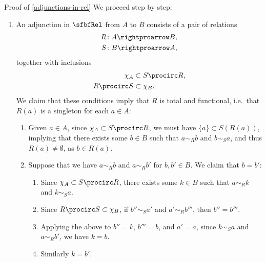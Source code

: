 \begin{Proof}{Proof of \cref{adjunctions-in-rel}}%
    We proceed step by step:
    \begin{enumerate}
        \item\label{proof-of-adjunctions-in-rel-1}An adjunction in $\sfbfRel$ from $A$ to $B$ consists of a pair of relations
            \begin{align*}
                R &\colon A\rightproarrow B,\\
                S &\colon B\rightproarrow A,
            \end{align*}
            together with inclusions
            \begin{align*}
                \chi_{A}    &\subset S\procirc R,\\
                R\procirc S &\subset \chi_{B}.
            \end{align*}
            We claim that these conditions imply that $R$ is total and functional, i.e.\ that $R(a)$ is a singleton for each $a\in A$:
            \begin{enumerate}
                \item\label{proof-of-adjunctions-in-rel-1a}Given $a\in A$, since $\chi_{A}\subset S\procirc R$, we must have $\{a\}\subset S(R(a))$, implying that there exists some $b\in B$ such that $a\sim_{R}b$ and $b\sim_{S}a$, and thus $R(a)\neq\emptyset$, as $b\in R(a)$.
                \item\label{proof-of-adjunctions-in-rel-1b}Suppose that we have $a\sim_{R}b$ and $a\sim_{R}b'$ for $b,b'\in B$. We claim that $b=b'$:
                    \begin{enumerate}
                        \item\label{proof-of-adjunctions-in-rel-1bi}Since $\chi_{A}\subset S\procirc R$, there exists some $k\in B$ such that $a\sim_{R}k$ and $k\sim_{S}a$.
                        \item\label{proof-of-adjunctions-in-rel-1bii}Since $R\procirc S\subset\chi_{B}$, if $b''\sim_{S}a'$ and $a'\sim_{R}b'''$, then $b''=b'''$.
                        \item\label{proof-of-adjunctions-in-rel-1biii}Applying the above to $b''=k$, $b'''=b$, and $a'=a$, since $k\sim_{S}a$ and $a\sim_{R}b'$, we have $k=b$.
                        \item\label{proof-of-adjunctions-in-rel-1biv}Similarly $k=b'$.

\end{enumerate}
\end{enumerate}
\end{enumerate}
\end{Proof}

